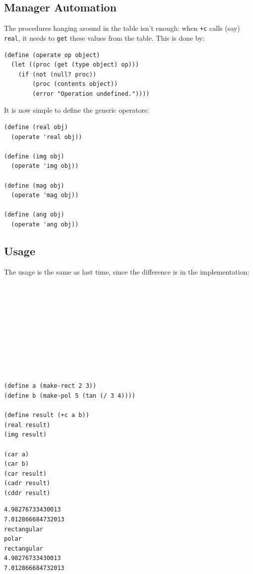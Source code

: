 \documentclass[9pt]{report}
\begin{document}
\subsection{Manager Automation}
\label{sec:orgaef0819}

The procedures hanging around in the table isn't enough: when \texttt{+c}
calls (say) \texttt{real}, it needs to \texttt{get} these values from the table.
This is done by:

\begin{verbatim}
(define (operate op object)
  (let ((proc (get (type object) op)))
    (if (not (null? proc))
        (proc (contents object))
        (error "Operation undefined."))))
\end{verbatim}

It is now simple to define the generic operators:

\begin{verbatim}
(define (real obj)
  (operate 'real obj))

(define (img obj)
  (operate 'img obj))

(define (mag obj)
  (operate 'mag obj))

(define (ang obj)
  (operate 'ang obj))
\end{verbatim}


\subsection{Usage}
\label{sec:orgd078cf4}

The usage is the same as last time, since the difference is in the
implementation:

\begin{verbatim}










(define a (make-rect 2 3))
(define b (make-pol 5 (tan (/ 3 4))))

(define result (+c a b))
(real result)
(img result)

(car a)
(car b)
(car result)
(cadr result)
(cddr result)

\end{verbatim}

\begin{verbatim}
4.98276733430013
7.012866684732013
rectangular
polar
rectangular
4.98276733430013
7.012866684732013
\end{verbatim}
\end{document}
